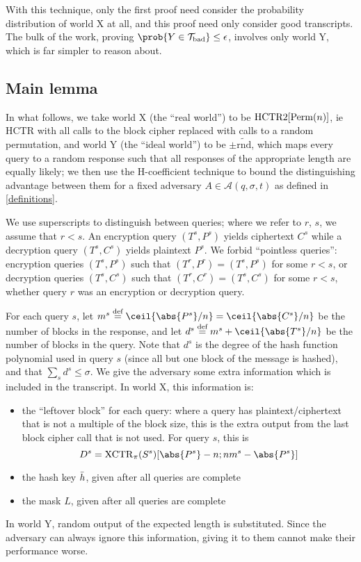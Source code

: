 \documentclass[hctr2.tex]{subfiles}
\begin{document}
With this technique, only the first proof
need consider the probability
distribution of world X at all,
and this proof need only consider good transcripts.
The bulk of the work, proving
\(\prob{Y \in \Tb} \leq \epsilon\),
involves only world Y, which is far simpler
to reason about.

\subsection{Main lemma}\label{mainlemma}
In what follows, we take world X (the ``real world'') 
to be \(\operatorname{HCTR2}[\operatorname{Perm}(n)]\),
ie HCTR with all calls to the block cipher
replaced with calls to a random permutation,
and world Y (the ``ideal world'') to be \(\pm\widetilde{\mathrm{rnd}}\),
which maps every query to a random response such that
all responses of the appropriate length are equally likely;
we then use the H-coefficient technique to bound
the distinguishing advantage between them
for a fixed adversary \(A \in \mathcal{A}(q, \sigma, t)\)
as defined in \autoref{definitions}.

We use superscripts to distinguish between queries;
where we refer to \(r\), \(s\), we assume that \(r < s\).
An encryption query \((T^s, P^s)\) yields ciphertext \(C^s\)
while a decryption query \((T^s, C^s)\)
yields plaintext \(P^s\).
We forbid ``pointless queries'':
encryption queries \((T^s, P^s)\)
such that \((T^r, P^r) = (T^s, P^s)\) for some \(r < s\), 
or decryption queries \((T^s, C^s)\)
such that \((T^r, C^r) = (T^s, C^s)\) for some \(r < s\),
whether query \(r\) was an encryption or decryption query.

For each query \(s\), 
let \(m^s \defeq \ceil{\abs{P^s}/n} = \ceil{\abs{C^s}/n}\)
be the number of blocks in the response,
and let \(d^s \defeq m^s + \ceil{\abs{T^s}/n}\)
be the number of blocks in the query.
Note that \(d^s\) is the degree of the hash
function polynomial used in query \(s\)
(since all but one block of the message is hashed),
and that \(\sum_s d^s \leq \sigma\).
We give the adversary some extra information
which is included in the transcript.
In world X, this information is:
\begin{itemize}
    \item the ``leftover block'' for each query:
    where a query has plaintext/ciphertext
    that is not a multiple of the block size,
    this is the extra output from the last
    block cipher call that is not used.
    For query \(s\), this is 
    \begin{displaymath}
        D^s = \XCTR_\pi(S^s)[\abs{P^s} - n; nm^s-\abs{P^s}]
    \end{displaymath}
    \item the hash key \(\bar{h}\), given after all queries are complete
    \item the mask \(L\), given after all queries are complete
\end{itemize}
In world Y, random output of the expected
length is substituted. Since the adversary can always ignore
this information, giving it to them cannot make their performance worse.
\end{document}
